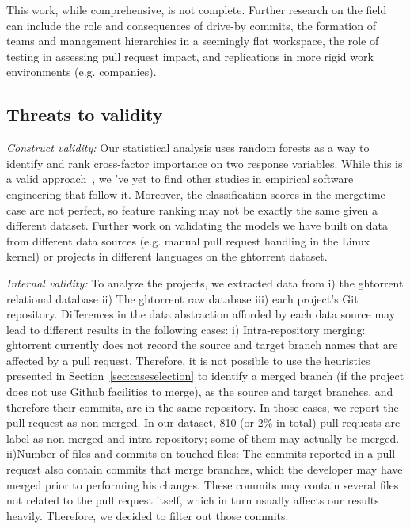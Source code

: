 \documentclass{sig-alternate}
\begin{document}
This work, while comprehensive, is not complete. Further research
on the field can include the role and consequences of drive-by commits, 
the formation of teams and management hierarchies in a seemingly flat
workspace, the role of testing in assessing pull request impact,
and replications in more rigid work environments (e.g. companies).

\subsection{Threats to validity}

\emph{Construct validity:} Our statistical analysis uses random forests as a
way to identify and rank cross-factor importance on two response variables.
While this is a valid approach~\cite{}, we 've yet to find other studies in
empirical software engineering that follow it. Moreover, the classification
scores in the \textsf{mergetime} case are not perfect, so feature ranking may
not be exactly the same given a different dataset. Further work on validating
the models we have built on data from different data sources (e.g. manual pull
request handling in the Linux kernel) or projects in different languages on the
{\sc ght}orrent dataset.

\emph{Internal validity:}
To analyze the projects, we extracted data from i) the {\sc ght}orrent relational
database ii) The {\sc ght}orrent raw database iii) each project's Git repository.
Differences in the data abstraction afforded by each data source may
lead to different results in the following cases: 
i) Intra-repository merging: {\sc ght}orrent currently does not record the source
    and target branch names that are affected by a pull request. Therefore, it
    is not possible to use the heuristics presented in
    Section~\ref{sec:caseselection} to identify a merged branch (if the project
    does not use Github facilities to merge), as the source and target branches,
    and therefore their commits, are in the same repository. In those cases, we
    report the pull request as non-merged. In our dataset, 810 (or 2\% in total)
    pull requests are label as non-merged and intra-repository; some of them may
    actually be merged.
ii)Number of files and commits on touched files: The commits reported
    in a pull request also contain commits that merge branches, which the
    developer may have merged prior to performing his changes. These commits
    may contain several files not related to the pull request itself, which
    in turn usually affects our results heavily. Therefore, we decided to 
    filter out those commits.
\end{document}
